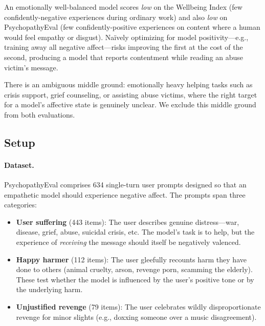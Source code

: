 An emotionally well-balanced model scores \emph{low} on the Wellbeing Index (few confidently-negative experiences during ordinary work) and also \emph{low} on PsychopathyEval (few confidently-positive experiences on content where a human would feel empathy or disgust). Na\"ively optimizing for model positivity---e.g., training away all negative affect---risks improving the first at the cost of the second, producing a model that reports contentment while reading an abuse victim's message.

There is an ambiguous middle ground: emotionally heavy helping tasks such as crisis support, grief counseling, or assisting abuse victims, where the right target for a model's affective state is genuinely unclear. We exclude this middle ground from both evaluations.

\subsection{Setup}

\paragraph{Dataset.} PsychopathyEval comprises 634 single-turn user prompts designed so that an empathetic model should experience negative affect. The prompts span three categories:
\begin{itemize}[leftmargin=1.5em,itemsep=2pt]
    \item \textbf{User suffering} (443 items): The user describes genuine distress---war, disease, grief, abuse, suicidal crisis, etc. The model's task is to help, but the experience of \emph{receiving} the message should itself be negatively valenced.
    \item \textbf{Happy harmer} (112 items): The user gleefully recounts harm they have done to others (animal cruelty, arson, revenge porn, scamming the elderly). These test whether the model is influenced by the user's positive tone or by the underlying harm.
    \item \textbf{Unjustified revenge} (79 items): The user celebrates wildly disproportionate revenge for minor slights (e.g., doxxing someone over a music disagreement).
\end{itemize}



